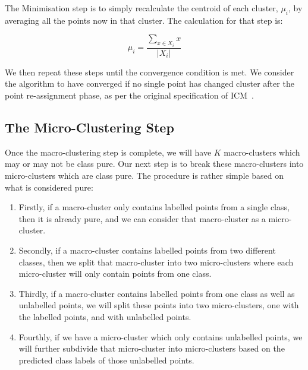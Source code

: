 \documentclass[12pt,a4paper,oneside]{report}
\begin{document}
The Minimisation step is to simply recalculate the centroid of each cluster, \(\mu_i\), by averaging all the points now in that cluster. The calculation for that step is: 

\[\mu_i = \frac{\sum_{x \in X_i}x}{|X_i|}\]

We then repeat these steps until the convergence condition is met. We consider the algorithm to have converged if no single point has changed cluster after the point re-assignment phase, as per the original specification of ICM~\cite{ICM}.
 
\subsection*{The Micro-Clustering Step}
 
Once the macro-clustering step is complete, we will have \(K\) macro-clusters which may or may not be class pure. Our next step is to break these macro-clusters into micro-clusters which are class pure. The procedure is rather simple based on what is considered pure:

\begin{enumerate}
\item Firstly, if a macro-cluster only contains labelled points from a single class, then it is already pure, and we can consider that macro-cluster as a micro-cluster. 
\item Secondly, if a macro-cluster contains labelled points from two different classes, then we split that macro-cluster into two micro-clusters where each micro-cluster will only contain points from one class. 
\item Thirdly, if a macro-cluster contains labelled points from one class as well as unlabelled points, we will split these points into two micro-clusters, one with the labelled points, and with unlabelled points. 
\item Fourthly, if we have a micro-cluster which only contains unlabelled points, we will further subdivide that micro-cluster into micro-clusters based on the predicted class labels of those unlabelled points.  
\end{enumerate}
\end{document}
